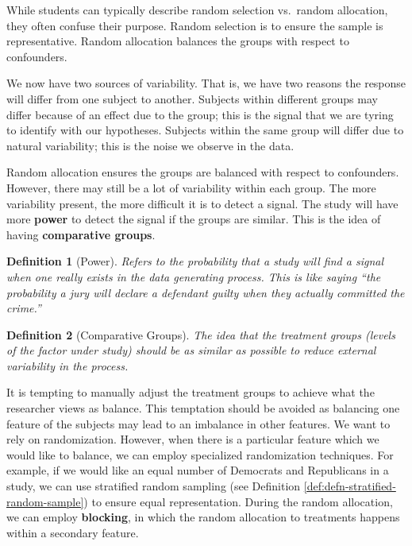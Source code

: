 \documentclass[
]{book}
\theoremstyle{plain}
\theoremstyle{mydefn}
\newtheorem{definition}{Definition}[chapter]
\theoremstyle{myexmpl}
\theoremstyle{remark}
\begin{document}
\begin{rmdtip}
While students can typically describe random selection vs.~random allocation, they often confuse their purpose. Random selection is to ensure the sample is representative. Random allocation balances the groups with respect to confounders.
\end{rmdtip}

We now have two sources of variability. That is, we have two reasons the response will differ from one subject to another. Subjects within different groups may differ because of an effect due to the group; this is the signal that we are tyring to identify with our hypotheses. Subjects within the same group will differ due to natural variability; this is the noise we observe in the data.

Random allocation ensures the groups are balanced with respect to confounders. However, there may still be a lot of variability within each group. The more variability present, the more difficult it is to detect a signal. The study will have more \textbf{power} to detect the signal if the groups are similar. This is the idea of having \textbf{comparative groups}.

\begin{definition}[Power]
\protect\hypertarget{def:defn-power}{}{\label{def:defn-power} {} }Refers to the probability that a study will find a signal when one really exists in the data generating process. This is like saying ``the probability a jury will declare a defendant guilty when they actually committed the crime.''
\end{definition}

\begin{definition}[Comparative Groups]
\protect\hypertarget{def:defn-comparative-groups}{}{\label{def:defn-comparative-groups} {} }The idea that the treatment groups (levels of the factor under study) should be as similar as possible to reduce external variability in the process.
\end{definition}

It is tempting to manually adjust the treatment groups to achieve what the researcher views as balance. This temptation should be avoided as balancing one feature of the subjects may lead to an imbalance in other features. We want to rely on randomization. However, when there is a particular feature which we would like to balance, we can employ specialized randomization techniques. For example, if we would like an equal number of Democrats and Republicans in a study, we can use stratified random sampling (see Definition \ref{def:defn-stratified-random-sample}) to ensure equal representation. During the random allocation, we can employ \textbf{blocking}, in which the random allocation to treatments happens within a secondary feature.
\end{document}

